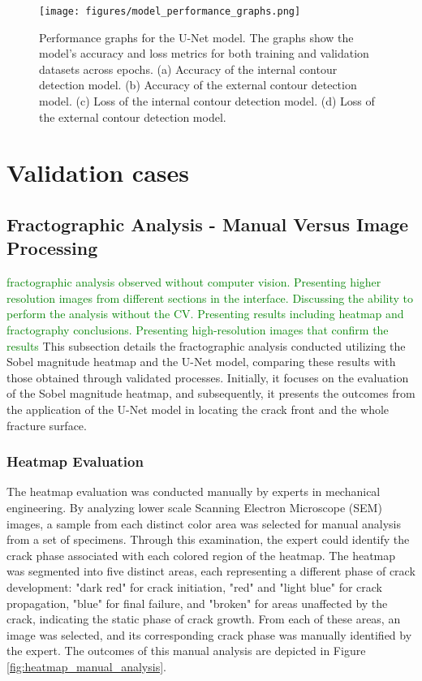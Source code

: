 \documentclass[preprint,12pt]{elsarticle}
\begin{document}
\begin{figure}[t!]
    \centering
    \begin{adjustbox}{max width=\linewidth, max height=\textheight}
        \texttt{[image: figures/model\_performance\_graphs.png]}
    \end{adjustbox}
    \caption{Performance graphs for the U-Net model. The graphs show the model's accuracy and loss metrics for both training and validation datasets across epochs. (a) Accuracy of the internal contour detection model. (b) Accuracy of the external contour detection model. (c) Loss of the internal contour detection model. (d) Loss of the external contour detection model.}
    \label{fig:model_performance_graphs}
\end{figure}


\section{Validation cases}
\label{Sec: Validation cases}

\subsection{Fractographic Analysis - Manual Versus Image Processing}
\label{Subsec: Experimental Results}
\textcolor{green}{fractographic analysis observed without computer vision. Presenting higher resolution images from different sections in the interface. Discussing the ability to perform the analysis without the CV. Presenting results including heatmap and fractography conclusions. Presenting high-resolution images that confirm the results }
This subsection details the fractographic analysis conducted utilizing the Sobel magnitude heatmap and the U-Net model, comparing these results with those obtained through validated processes.
Initially, it focuses on the evaluation of the Sobel magnitude heatmap, and subsequently, it presents the outcomes from the application of the U-Net model in locating the crack front and the whole fracture surface.

\subsubsection{Heatmap Evaluation}
The heatmap evaluation was conducted manually by experts in mechanical engineering.
By analyzing lower scale Scanning Electron Microscope (SEM) images, a sample from each distinct color area was selected for manual analysis from a set of specimens. Through this examination, the expert could identify the crack phase associated with each colored region of the heatmap.
The heatmap was segmented into five distinct areas, each representing a different phase of crack development: "dark red" for crack initiation, "red" and "light blue" for crack propagation, "blue" for final failure, and "broken" for areas unaffected by the crack, indicating the static phase of crack growth. From each of these areas, an image was selected, and its corresponding crack phase was manually identified by the expert. The outcomes of this manual analysis are depicted in Figure \ref{fig:heatmap_manual_analysis}.
\end{document}
